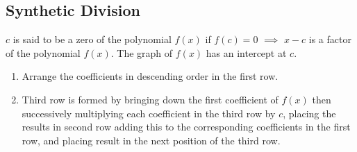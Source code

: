 \subsection{Synthetic Division}

$c$ is said to be a zero of the polynomial $f(x)$ if $f(c) = 0$ $\implies$ $x-c$ is a factor of the polynomial $f(x)$. The graph of $f(x)$ has an intercept at $c$.

\begin{enumerate}
\item Arrange the coefficients in descending order in the first row.

\item Third row is formed by bringing down the first coefficient of $f(x)$ then successively multiplying each coefficient in the third row by $c$, placing the results in second row adding this to the corresponding coefficients in the first row, and placing result in the next position of the third row.
\end{enumerate}
 